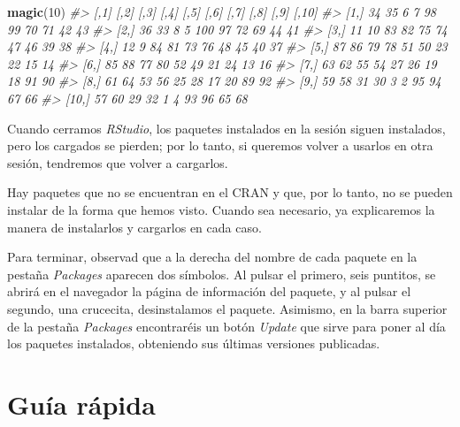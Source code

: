 \documentclass[
]{book}
\newenvironment{Shaded}{\begin{snugshade}}{\end{snugshade}}
\newcommand{\CommentTok}[1]{\textcolor[rgb]{0.56,0.35,0.01}{\textit{#1}}}
\newcommand{\DecValTok}[1]{\textcolor[rgb]{0.00,0.00,0.81}{#1}}
\newcommand{\KeywordTok}[1]{\textcolor[rgb]{0.13,0.29,0.53}{\textbf{#1}}}
\newcommand{\NormalTok}[1]{#1}
\theoremstyle{definition}
\theoremstyle{definition}
\theoremstyle{definition}
\theoremstyle{remark}
\begin{document}
\begin{Shaded}
\begin{Highlighting}[]
\KeywordTok{magic}\NormalTok{(}\DecValTok{10}\NormalTok{)}
\CommentTok{\#\textgreater{}       [,1] [,2] [,3] [,4] [,5] [,6] [,7] [,8] [,9] [,10]}
\CommentTok{\#\textgreater{}  [1,]   34   35    6    7   98   99   70   71   42    43}
\CommentTok{\#\textgreater{}  [2,]   36   33    8    5  100   97   72   69   44    41}
\CommentTok{\#\textgreater{}  [3,]   11   10   83   82   75   74   47   46   39    38}
\CommentTok{\#\textgreater{}  [4,]   12    9   84   81   73   76   48   45   40    37}
\CommentTok{\#\textgreater{}  [5,]   87   86   79   78   51   50   23   22   15    14}
\CommentTok{\#\textgreater{}  [6,]   85   88   77   80   52   49   21   24   13    16}
\CommentTok{\#\textgreater{}  [7,]   63   62   55   54   27   26   19   18   91    90}
\CommentTok{\#\textgreater{}  [8,]   61   64   53   56   25   28   17   20   89    92}
\CommentTok{\#\textgreater{}  [9,]   59   58   31   30    3    2   95   94   67    66}
\CommentTok{\#\textgreater{} [10,]   57   60   29   32    1    4   93   96   65    68}
\end{Highlighting}
\end{Shaded}

Cuando cerramos \emph{RStudio}, los paquetes instalados en la sesión siguen instalados, pero los cargados se pierden; por lo tanto, si queremos volver a usarlos en otra sesión, tendremos que volver a cargarlos.

Hay paquetes que no se encuentran en el CRAN y que, por lo tanto, no se pueden instalar de la forma que hemos visto. Cuando sea necesario, ya explicaremos la manera de instalarlos y cargarlos en cada caso.

Para terminar, observad que a la derecha del nombre de cada paquete en la pestaña \emph{Packages} aparecen dos símbolos. Al pulsar el primero, seis puntitos, se abrirá en el navegador la página de información del paquete, y al pulsar el segundo, una crucecita, desinstalamos el paquete. Asimismo, en la barra superior de la pestaña \emph{Packages} encontraréis un botón \emph{Update} que sirve para poner al día los paquetes instalados, obteniendo sus últimas versiones publicadas.

\hypertarget{guuxeda-ruxe1pida}{%
\section{Guía rápida}\label{guuxeda-ruxe1pida}}
\end{document}
